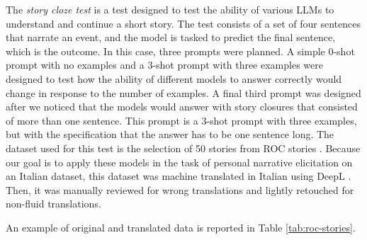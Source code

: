The \emph{story cloze test} \cite{mostafazadeh2016corpus} is a test designed to test the ability of various LLMs to understand and continue a short story. The test consists of a set of four sentences that narrate an event, and the model is tasked to predict the final sentence, which is the outcome. In this case, three prompts were planned. A simple 0-shot prompt with no examples and a 3-shot prompt with three examples were designed to test how the ability of different models to answer correctly would change in response to the number of examples. A final third prompt was designed after we noticed that the models would answer with story closures that consisted of more than one sentence. This prompt is a 3-shot prompt with three examples, but with the specification that the answer has to be one sentence long. The dataset used for this test is the selection of 50 stories from ROC stories \cite{mostafazadeh2016corpus}. Because our goal is to apply these models in the task of personal narrative elicitation on an Italian dataset, this dataset was machine translated in Italian using DeepL \cite{deepl}. Then, it was manually reviewed for wrong translations and lightly retouched for non-fluid translations.

An example of original and translated data is reported in Table \ref{tab:roc-stories}. 


